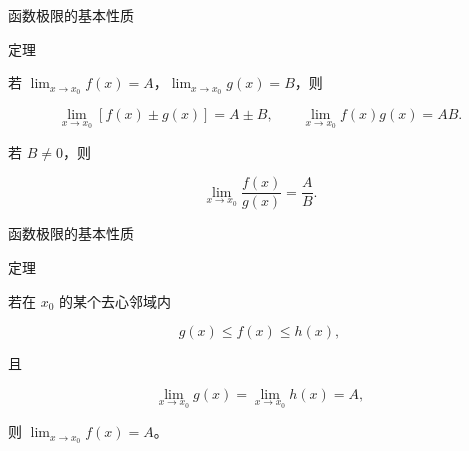 \documentclass[aspectratio=169,10pt,fontset=fandol]{ctexbeamer}
\begin{document}
\begin{frame}[t,fragile]{函数极限的基本性质}
\normalsize
\begin{block}{定理}
{\normalsize


若 \(\lim_{x\to x_0}f(x)=A\)，\(\lim_{x\to x_0}g(x)=B\)，则

\[

\lim_{x\to x_0}[f(x)\pm g(x)]=A\pm B,\qquad

\lim_{x\to x_0}f(x)g(x)=AB.

\]

若 \(B\neq0\)，则

\[

\lim_{x\to x_0}\frac{f(x)}{g(x)}=\frac AB.

\]


}
\end{block}
\end{frame}
\begin{frame}[t,fragile]{函数极限的基本性质}
\normalsize
\begin{block}{定理}
{\normalsize


若在 \(x_0\) 的某个去心邻域内

\[

g(x)\leq f(x)\leq h(x),

\]

且

\[

\lim_{x\to x_0}g(x)=\lim_{x\to x_0}h(x)=A,

\]

则 \(\lim_{x\to x_0}f(x)=A\)。


}
\end{block}
\end{frame}
\end{document}
